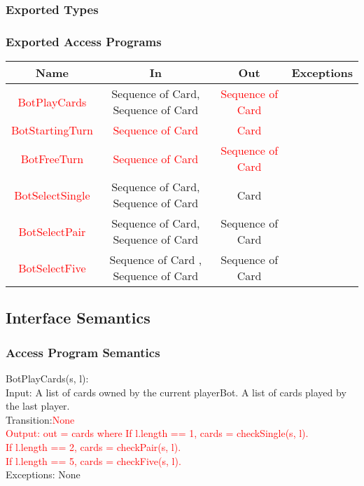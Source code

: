 \documentclass[12pt, titlepage]{article}
\begin{document}
\subsubsection{Exported Types}

\subsubsection{Exported Access Programs}
\begin{tabular}[pos]{|c|c|c|c|}
\hline
\textbf{Name}& \textbf{In} & \textbf{Out} & \textbf{Exceptions} \\ \hline
\textcolor{red}{BotPlayCards} & Sequence of Card, Sequence of Card & \textcolor{red}{Sequence of Card} & ~\\ \hline
\textcolor{red}{BotStartingTurn} & \textcolor{red}{Sequence of Card} & \textcolor{red}{Card} & ~\\ \hline
\textcolor{red}{BotFreeTurn} & \textcolor{red}{Sequence of Card} & \textcolor{red}{Sequence of Card} & ~\\ \hline 
\textcolor{red}{BotSelectSingle} & Sequence of Card, Sequence of Card & Card & ~ \\ \hline
\textcolor{red}{BotSelectPair} & Sequence of Card, Sequence of Card & Sequence of Card & ~ \\ \hline
\textcolor{red}{BotSelectFive} & Sequence of Card , Sequence of Card& Sequence of Card & ~\\ \hline
\end{tabular}
\subsection{Interface Semantics}
\subsubsection{Access Program Semantics} 

\noindent BotPlayCards(s, l):\\
Input: A list of cards owned by the current playerBot. A list of cards played by the last player.\\
Transition:\textcolor{red}{None}\\
\textcolor{red}{Output: out = cards where
If l.length == 1, cards = checkSingle(s, l).\\
If l.length == 2, cards = checkPair(s, l).\\
If l.length == 5, cards =  checkFive(s, l).}\\
Exceptions: None \\
\end{document}
